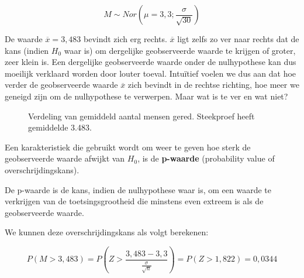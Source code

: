\[M \sim  Nor(\mu = 3,3; \frac{\sigma}{\sqrt{30}})\]

De waarde $\overline{x} = 3,483$ bevindt zich erg rechts. $\overline{x}$ ligt zelfs zo ver naar rechts dat de kans (indien $H_{0}$ waar is) om dergelijke geobserveerde waarde te krijgen of groter, zeer klein is. Een dergelijke geobserveerde waarde onder de nulhypothese kan dus moeilijk verklaard worden door louter toeval. Intu\"itief voelen we dus aan dat hoe verder de geobserveerde waarde $\overline{x}$ zich bevindt in de rechtse richting, hoe meer we geneigd zijn om de nulhypothese te verwerpen. Maar wat is te ver en wat niet?

\begin{figure}[t]
  \centering
  \caption{Verdeling van gemiddeld aantal mensen gered. Steekproef heeft gemiddelde 3.483.}
  \label{fig:gemiddelde aantal mensen}
\end{figure}

Een karakteristiek die gebruikt wordt om weer te geven hoe sterk de geobserveerde waarde afwijkt van $H_{0}$, is de \textbf{p-waarde} (probability value of overschrijdingskans).

\begin{definition}[p-waarde]
  De p-waarde is de kans, indien de nulhypothese waar is, om een waarde te verkrijgen van de toetsingsgrootheid die minstens even extreem is als de geobserveerde waarde.
\end{definition}

We kunnen deze overschrijdingskans als volgt berekenen:

\[ P(M > 3,483) = P \left(Z> \frac{3,483 - 3,3}{\frac{\sigma}{\sqrt{n}}}\right) = P (Z > 1,822) = 0,0344 \]

